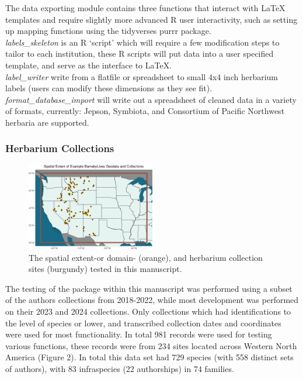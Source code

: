 \documentclass[
]{article}
\begin{document}
The data exporting module contains three functions that interact with
LaTeX templates and require slightly more advanced R user interactivity,
such as setting up mapping functions using the tidyverses purrr
package.\\
\emph{labels\_skeleton} is an R `script' which will require a few
modification steps to tailor to each institution, these R scripts will
put data into a user specified template, and serve as the interface to
LaTeX.\\
\emph{label\_writer} write from a flatfile or spreadsheet to small 4x4
inch herbarium labels (users can modify these dimensions as they see
fit). \emph{format\_database\_import} will write out a spreadsheet of
cleaned data in a variety of formats, currently: Jepson, Symbiota, and
Consortium of Pacific Northwest herbaria are supported.

\subsubsection{Herbarium Collections}\label{herbarium-collections}

\begin{figure}
\centering
\includegraphics[width=0.5\textwidth,height=\textheight]{../graphics/plots/collections_map.png}
\caption{The spatial extent-or domain- (orange), and herbarium
collection sites (burgundy) tested in this manuscript.}
\end{figure}

The testing of the package within this manuscript was performed using a
subset of the authors collections from 2018-2022, while most development
was performed on their 2023 and 2024 collections. Only collections which
had identifications to the level of species or lower, and transcribed
collection dates and coordinates were used for most functionality. In
total 981 records were used for testing various functions, these records
were from 234 sites located across Western North America (Figure 2). In
total this data set had 729 species (with 558 distinct sets of authors),
with 83 infraspecies (22 authorships) in 74 families.
\end{document}
